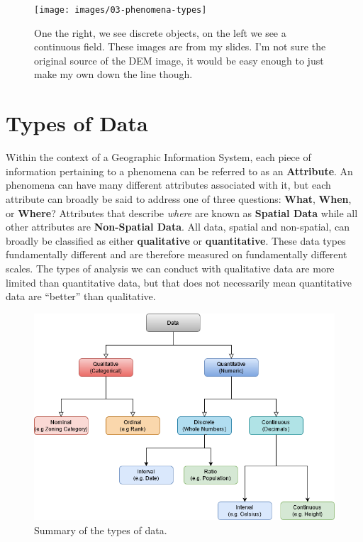\documentclass[
]{book}
\begin{document}
\begin{figure}
\centering
\texttt{[image: images/03-phenomena-types]}
\caption{One the right, we see discrete objects, on the left we see a continuous field. These images are from my slides. I'm not sure the original source of the DEM image, it would be easy enough to just make my own down the line though.}
\end{figure}

\hypertarget{types-of-data-1}{%
\section{Types of Data}\label{types-of-data-1}}

Within the context of a Geographic Information System, each piece of information pertaining to a phenomena can be referred to as an \textbf{Attribute}. An phenomena can have many different attributes associated with it, but each attribute can broadly be said to address one of three questions: \textbf{What}, \textbf{When}, or \textbf{Where}? Attributes that describe \emph{where} are known as \textbf{Spatial Data} while all other attributes are \textbf{Non-Spatial Data}. All data, spatial and non-spatial, can broadly be classified as either \textbf{qualitative} or \textbf{quantitative}. These data types fundamentally different and are therefore measured on fundamentally different scales. The types of analysis we can conduct with qualitative data are more limited than quantitative data, but that does not necessarily mean quantitative data are ``better'' than qualitative.

\begin{figure}
\centering
\includegraphics{images/03-data-types.png}
\caption{Summary of the types of data.}
\end{figure}
\end{document}
